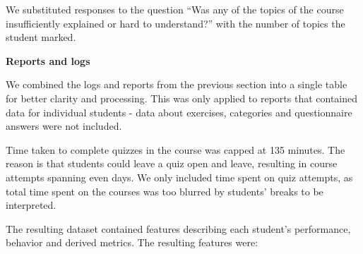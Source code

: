 We substituted responses to the question \enquote{Was any of the topics of the course insufficiently explained or hard to understand?} with the number of topics the student marked.

\textbf{Reports and logs}

We combined the logs and reports from the previous section into a single table for better clarity and processing. This was only applied to reports that contained data for individual students - data about exercises, categories and questionnaire answers were not included. 




    

Time taken to complete quizzes in the course was capped at 135 minutes. The reason is that students could leave a quiz open and leave, resulting in course attempts spanning even days. We only included time spent on quiz attempts, as total time spent on the courses was too blurred by students' breaks to be interpreted.

The resulting dataset contained features describing each student's performance, behavior and derived metrics. The resulting features were:

